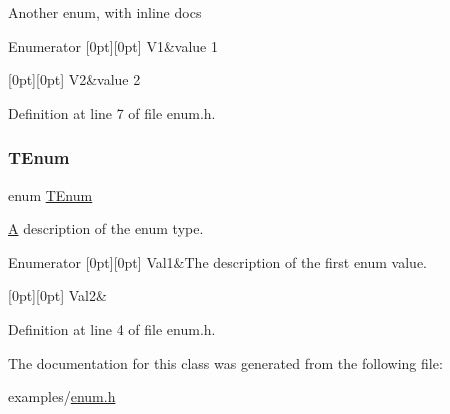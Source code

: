 Another enum, with inline docs \begin{DoxyEnumFields}{Enumerator}
[0pt][0pt]{}\mbox{\label{class_enum___test_a34ccf30f7cd970ac542d71619b2647f1ae307daa999bfd69743cd368d6d372c82}} 
V1&value 1 \\
\hline

[0pt][0pt]{}\mbox{\label{class_enum___test_a34ccf30f7cd970ac542d71619b2647f1a3e329bb4aa8def056d4ae1e93751a652}} 
V2&value 2 \\
\hline

\end{DoxyEnumFields}


Definition at line 7 of file enum.\+h.

\mbox{\label{class_enum___test_a33e3643b66dfa91e4fb7cc663a23e166}} 
\subsubsection{\texorpdfstring{T\+Enum}{TEnum}}
{\footnotesize\ttfamily enum \hyperlink{class_enum___test_a33e3643b66dfa91e4fb7cc663a23e166}{T\+Enum}}

\hyperlink{class_a}{A} description of the enum type. \begin{DoxyEnumFields}{Enumerator}
[0pt][0pt]{}\mbox{\label{class_enum___test_a33e3643b66dfa91e4fb7cc663a23e166ace53328155b5c1c55b0744a7429b9d02}} 
Val1&The description of the first enum value. \\
\hline

[0pt][0pt]{}\mbox{\label{class_enum___test_a33e3643b66dfa91e4fb7cc663a23e166a470f89a037b58ee4ce04efe02907b410}} 
Val2&\\
\hline

\end{DoxyEnumFields}


Definition at line 4 of file enum.\+h.



The documentation for this class was generated from the following file\+:\begin{DoxyCompactItemize}
\item 
examples/\hyperlink{enum_8h}{enum.\+h}\end{DoxyCompactItemize}
